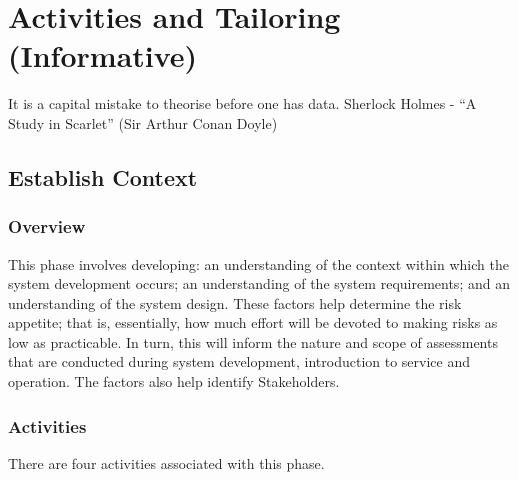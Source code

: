 %
%
\section{Activities and Tailoring (Informative)} \label{bkm:activitiestailoring}

\dsiwgSectionQuote
  {It is a capital mistake to theorise before one has data.}
  {Sherlock Holmes - ``A Study in Scarlet'' (Sir Arthur Conan Doyle)}


\subsection{Establish Context}
\subsubsection{Overview}
This phase involves developing: an understanding of the context within which the system development occurs; an understanding of the system requirements; and an understanding of the system design.
These factors help determine the risk appetite; that is, essentially, how much effort will be devoted to making risks as low as practicable. In turn, this will inform the nature and scope of assessments that are conducted during system development, introduction to service and operation. The factors also help identify Stakeholders.

\subsubsection{Activities}
There are four activities associated with this phase.

